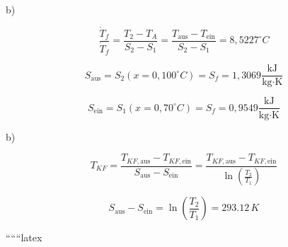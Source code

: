 b) 

\[
\frac{\dot{T}_f}{\dot{T}_f} = \frac{T_2 - T_A}{S_2 - S_1} = \frac{T_{\text{aus}} - T_{\text{ein}}}{S_2 - S_1} = 8,5227^\circ C
\]

\[
S_{\text{aus}} = S_2 (x = 0, 100^\circ C) = S_f = 1,3069 \frac{\text{kJ}}{\text{kg} \cdot \text{K}}
\]

\[
S_{\text{ein}} = S_1 (x = 0, 70^\circ C) = S_f = 0,9549 \frac{\text{kJ}}{\text{kg} \cdot \text{K}}
\]

b)

\[
T_{KF} = \frac{T_{KF, \text{aus}} - T_{KF, \text{ein}}}{S_{\text{aus}} - S_{\text{ein}}} = \frac{T_{KF, \text{aus}} - T_{KF, \text{ein}}}{\ln \left( \frac{T_2}{T_1} \right)}
\]

\[
S_{\text{aus}} - S_{\text{ein}} = \ln \left( \frac{T_2}{T_1} \right) = 293.12 \, K
\]

``````latex